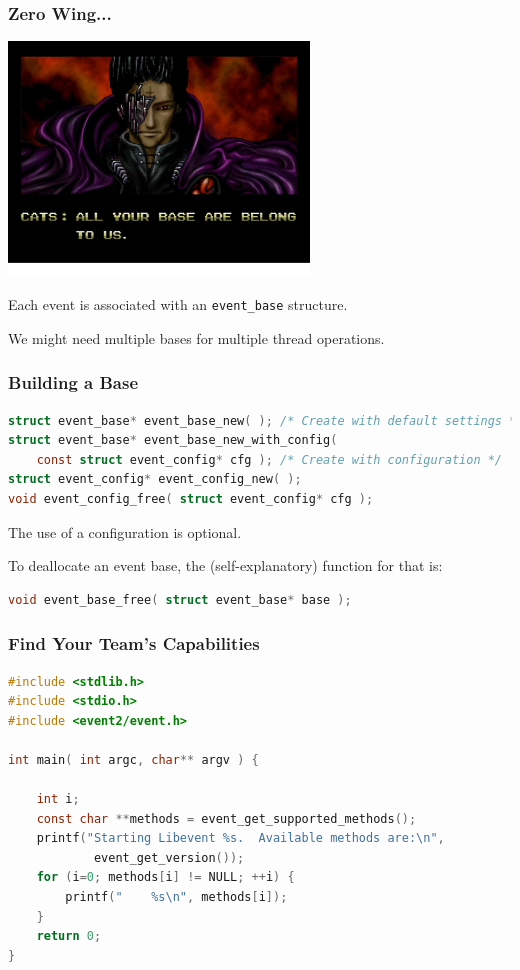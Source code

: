 \begin{frame}
	\frametitle{Zero Wing...}

	\begin{center}
		\includegraphics[width=0.6\textwidth]{images/allyourbase.png}
	\end{center}

	Each event is associated with an \texttt{event\_base} structure.

	We might need multiple bases for multiple thread operations.

\end{frame}

\begin{frame}[fragile]
	\frametitle{Building a Base}

	\begin{lstlisting}[language=C]
struct event_base* event_base_new( ); /* Create with default settings */
struct event_base* event_base_new_with_config( 
    const struct event_config* cfg ); /* Create with configuration */
struct event_config* event_config_new( );
void event_config_free( struct event_config* cfg );
\end{lstlisting}

	The use of a configuration is optional.

	To deallocate an event base, the (self-explanatory) function for that is:
	\begin{lstlisting}[language=C]
void event_base_free( struct event_base* base );
\end{lstlisting}

\end{frame}


\begin{frame}[fragile]
	\frametitle{Find Your Team's Capabilities}
	\begin{lstlisting}[language=C]
#include <stdlib.h>
#include <stdio.h>
#include <event2/event.h>

int main( int argc, char** argv ) { 

    int i;
    const char **methods = event_get_supported_methods();
    printf("Starting Libevent %s.  Available methods are:\n",
            event_get_version());
    for (i=0; methods[i] != NULL; ++i) {
        printf("    %s\n", methods[i]);
    }   
    return 0;
}
\end{lstlisting}

\end{frame}


